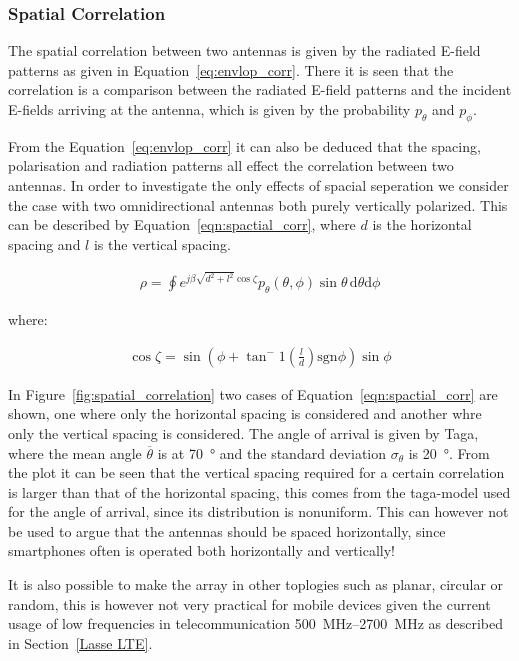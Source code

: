 \subsubsection{Spatial Correlation}
The spatial correlation between two antennas  is given by the radiated E-field patterns as given in Equation~\ref{eq:envlop_corr}. There it is seen that the correlation is a comparison between the radiated E-field patterns and the incident E-fields arriving at the antenna, which is given by the probability $p_\theta$ and $p_\phi$. 

From the Equation~\ref{eq:envlop_corr} it can also be deduced that the spacing, polarisation and radiation patterns all effect the correlation between two antennas. In order to investigate the only effects of spacial seperation we consider the case with two omnidirectional antennas both purely vertically polarized. This can be described by Equation~\ref{eqn:spactial_corr}\cite{Tim2012Practical}, where $d$ is the horizontal spacing and $l$ is the vertical spacing. 

\begin{align}
\label{eqn:spactial_corr}
  \rho = \oint e^{j\beta \sqrt{d^2+l^2}\cos\zeta}p_\theta(\theta,\phi)\sin\theta \, \mathrm{d} \theta \mathrm{d} \phi
\end{align}

where: 

\begin{align*}
\cos \zeta = \sin(\phi + \tan^-1(\frac{l}{d}) \text{sgn}\phi)\sin\phi  
\end{align*}

In Figure~\ref{fig:spatial_correlation} two cases of Equation~\ref{eqn:spactial_corr} are shown, one where only the horizontal spacing is considered and another whre only the vertical spacing is considered. The angle of arrival is given by Taga, where the mean angle $\overline{\theta}$ is at \SI{70}{\degree} and the standard deviation $\sigma_\theta$ is \SI{20}{\degree}. From the plot it can be seen that the vertical spacing required for a certain correlation is larger than that of the horizontal spacing, this comes from the taga-model used for the angle of arrival, since its distribution is nonuniform. This can however not be used to argue that the antennas should be spaced horizontally, since smartphones often is operated both horizontally and vertically! 

It is also possible to make the array in other toplogies such as planar, circular or random, this is however not very practical for mobile devices given the current usage of low frequencies in telecommunication \SIrange{500}{2700}{MHz} as described in Section~\ref{Lasse LTE}.

